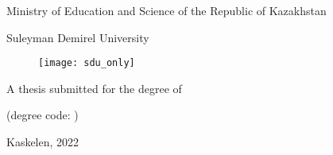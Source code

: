 \begin{titlepage}
\begin{center}
\large
Ministry of Education and Science of the Republic of Kazakhstan

Suleyman Demirel University

\vspace{1cm}
\begin{figure}[h]
    \centering
    \texttt{[image: sdu\_only]}
\end{figure}

\vspace{1cm}
\Large
\myauthor

\vspace{1cm}
\Large
\textbf{\mytitle}

\vspace{1cm}
\large
A thesis submitted for the degree of

\mydegree

(degree code: \mydegreecode)

\vfill
Kaskelen, 2022

\end{center}
\end{titlepage}
